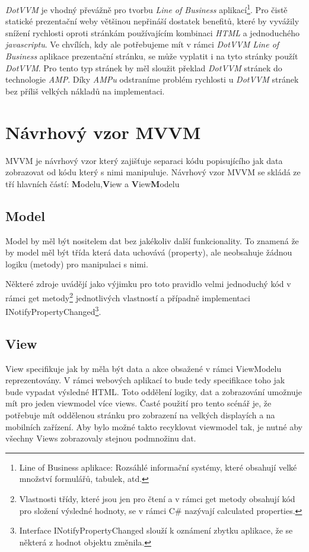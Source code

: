 \emph{DotVVM} je vhodný převážně pro tvorbu \emph{Line of Business} aplikací\footnote{Line of Business aplikace: Rozsáhlé informační systémy, které obsahují velké množství formulářů, tabulek, atd.}\cite{DotVVMIntro}. Pro čistě statické prezentační weby většinou nepřináší dostatek benefitů, které by vyvážily snížení rychlosti oproti stránkám používajícím kombinaci \emph{HTML} a jednoduchého \emph{javascriptu}. Ve chvílích, kdy ale potřebujeme mít v rámci \emph{DotVVM Line of Business} aplikace prezentační stránku, se může vyplatit i na tyto stránky použít \emph{DotVVM}. Pro tento typ stránek by měl sloužit překlad \emph{DotVVM} stránek do technologie \emph{AMP}. Díky \emph{AMPu} odstraníme problém rychlosti u \emph{DotVVM} stránek bez příliš velkých nákladů na implementaci.

\section{Návrhový vzor MVVM}
MVVM je návrhový vzor který zajišťuje separaci kódu popisujícího jak data zobrazovat od kódu který s nimi manipuluje. Návrhový vzor MVVM se skládá ze tří hlavních částí: \textbf{M}odelu,\textbf{V}iew a \textbf{V}iew\textbf{M}odelu

\subsection*{Model}
Model by měl být nositelem dat bez jakékoliv další funkcionality. To znamená že by model měl být třída která data uchovává (property), ale neobsahuje žádnou logiku (metody) pro manipulaci s nimi.

Některé zdroje uvádějí jako výjimku pro toto pravidlo velmi jednoduchý kód v rámci get metody\footnote{Vlastnosti třídy, které jsou jen pro čtení a v rámci get metody obsahují kód pro složení výsledné hodnoty, se v rámci C# nazývají calculated properties.} jednotlivých vlastností a případně implementaci INotifyPropertyChanged\footnote{Interface INotifyPropertyChanged slouží k oznámení zbytku aplikace, že se některá z hodnot objektu změnila.}.

\subsection*{View}
View specifikuje jak by měla být data a akce obsažené v rámci ViewModelu reprezentovány. V rámci webových aplikací to bude tedy specifikace toho jak bude vypadat výsledné HTML. Toto oddělení logiky, dat a zobrazování umožnuje mít pro jeden viewmodel více views. Časté použití pro tento scénář je, že potřebuje mít oddělenou stránku pro zobrazení na velkých displayích a na mobilních zařízení. Aby bylo možné takto recyklovat viewmodel tak, je nutné aby všechny Views zobrazovaly stejnou podmnožinu dat.
